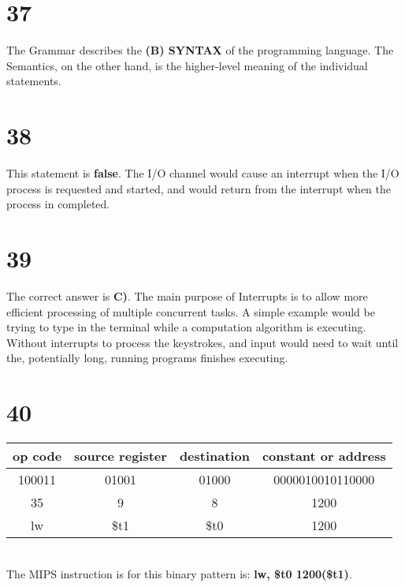 \documentclass[a4paper,11pt]{article}
\begin{document}

\section*{37}
The Grammar describes the {\bf (B) SYNTAX} of the programming language.  The Semantics, on the other hand, is the higher-level meaning of the individual statements.  


\section*{38}
This statement is {\bf false}.  The I/O channel would cause an interrupt when the I/O process is requested and started, and would return from the interrupt when the process in completed.


\section*{39}
The correct answer is {\bf C)}.   The main purpose of Interrupts is to allow more efficient processing of multiple concurrent tasks.  A simple example would be trying to type in the terminal while a computation algorithm is executing.  Without interrupts to process the keystrokes, and input would need to wait until the, potentially long, running programs finishes executing. 


\section*{40}
 \begin{tabular}{| c | c | c | c |}
  \hline	
  op code & source register & destination & constant or address\\  \hline  		
  100011 & 01001 & 01000 & 0000010010110000 \\ \hline
  35 & 9 & 8 & 1200  \\ \hline
  lw & \$t1 & \$t0 & 1200 \\ \hline
\end{tabular} \\

The MIPS instruction is for this binary pattern is: {\bf lw, \$t0 1200(\$t1)}.
\end{document}
